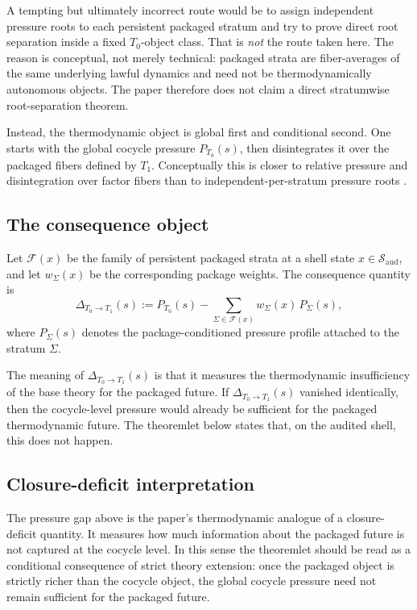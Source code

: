 \documentclass[11pt]{article}
\theoremstyle{definition}
\newcommand{\Tzero}{T_0}
\newcommand{\Tone}{T_1}
\begin{document}
A tempting but ultimately incorrect route would be to assign independent pressure roots to each persistent packaged stratum and try to prove direct root separation inside a fixed \(\Tzero\)-object class. That is \emph{not} the route taken here. The reason is conceptual, not merely technical: packaged strata are fiber-averages of the same underlying lawful dynamics and need not be thermodynamically autonomous objects. The paper therefore does not claim a direct stratumwise root-separation theorem.

Instead, the thermodynamic object is global first and conditional second. One starts with the global cocycle pressure \(P_{\Tzero}(s)\), then disintegrates it over the packaged fibers defined by \(\Tone\). Conceptually this is closer to relative pressure and disintegration over factor fibers than to independent-per-stratum pressure roots \cite{LedrappierWalters1977RelativisedVP,Walters1986RelativePressure}.

\subsection{The consequence object}

Let \(\mathcal{F}(x)\) be the family of persistent packaged strata at a shell state \(x\in \mathcal{S}_{\mathrm{aud}}\), and let \(w_{\Sigma}(x)\) be the corresponding package weights. The consequence quantity is
\[
\Delta_{\Tzero\to \Tone}(s)
:=
P_{\Tzero}(s)
-
\sum_{\Sigma\in\mathcal{F}(x)} w_{\Sigma}(x)\,P_{\Sigma}(s),
\]
where \(P_{\Sigma}(s)\) denotes the package-conditioned pressure profile attached to the stratum \(\Sigma\).

The meaning of \(\Delta_{\Tzero\to \Tone}(s)\) is that it measures the thermodynamic insufficiency of the base theory for the packaged future. If \(\Delta_{\Tzero\to \Tone}(s)\) vanished identically, then the cocycle-level pressure would already be sufficient for the packaged thermodynamic future. The theoremlet below states that, on the audited shell, this does not happen.

\subsection{Closure-deficit interpretation}

The pressure gap above is the paper’s thermodynamic analogue of a closure-deficit quantity. It measures how much information about the packaged future is not captured at the cocycle level. In this sense the theoremlet should be read as a conditional consequence of strict theory extension: once the packaged object is strictly richer than the cocycle object, the global cocycle pressure need not remain sufficient for the packaged future.
\end{document}
